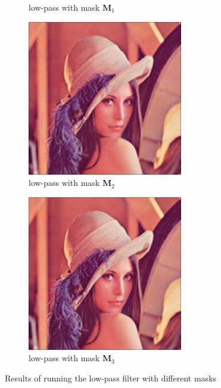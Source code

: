 \documentclass[12pt]{article}
\begin{document}
\begin{figure}[h]
\begin{subfigure}[t]{\subfiguresize}
        \caption{low-pass with mask $\mathbf{M}_1$}
    \end{subfigure}
    \begin{subfigure}[t]{\subfiguresize}
        \includegraphics[width=\textwidth]{lenac_lowpass2.png}
        \caption{low-pass with mask $\mathbf{M}_2$}
    \end{subfigure}
    \begin{subfigure}[t]{\subfiguresize}
        \includegraphics[width=\textwidth]{lenac_lowpass3.png}
        \caption{low-pass with mask $\mathbf{M}_3$}
    \end{subfigure}
    \caption{Results of running the low-pass filter with different masks}
    \label{fig:lowpass-results-original}
\end{figure}
\end{document}

